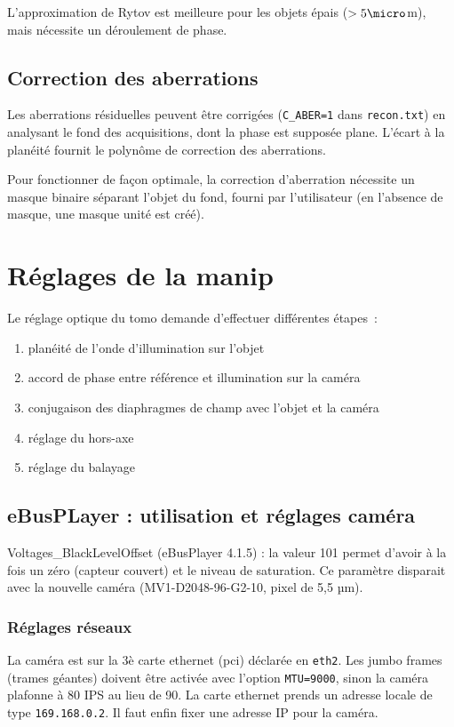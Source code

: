 \documentclass[	french,DIV=calc,%
							paper=a4,%
							fontsize=11pt,%
							twocolumn]{scrartcl}	 					%
\begin{document}
L'approximation de  Rytov est meilleure pour les objets épais ($>5\micro$m), mais nécessite un déroulement de phase.


\subsection{Correction des aberrations}

Les aberrations résiduelles peuvent être  corrigées (\texttt{C\_ABER=1} dans \texttt{recon.txt}) en analysant le fond des acquisitions, dont la phase est supposée plane. L'écart à la planéité fournit le polynôme de
correction des aberrations. 

Pour fonctionner de façon optimale, la correction d'aberration nécessite un masque binaire séparant l'objet du fond, fourni par l'utilisateur (en l'absence de masque, une masque unité
est créé).


\section{Réglages de la manip}
Le réglage  optique du tomo demande d'effectuer différentes étapes~:

\begin{enumerate}
 \item planéité de l'onde d'illumination sur l'objet
 \item accord de phase entre référence et illumination sur la caméra
 \item conjugaison des diaphragmes de champ avec l'objet et la caméra
 \item réglage du hors-axe
 \item réglage du balayage
\end{enumerate}


\subsection{eBusPLayer : utilisation et réglages caméra}
Voltages\_BlackLevelOffset (eBusPlayer 4.1.5) : la valeur 101 permet d'avoir à la fois un zéro (capteur couvert) et le niveau de saturation.  
Ce paramètre disparait avec la nouvelle caméra (MV1-D2048-96-G2-10, pixel de 5,5 µm).

\subsubsection{Réglages réseaux}
La caméra est sur la 3è carte ethernet (pci) déclarée en \texttt{eth2}. Les jumbo frames (trames géantes) doivent être activée avec 
l'option \texttt{MTU=9000}, sinon 
la caméra plafonne à 80 IPS au lieu de 90. La carte ethernet prends un adresse locale de type \texttt{169.168.0.2}. 
Il faut enfin fixer une adresse IP pour la caméra. 
\end{document}
